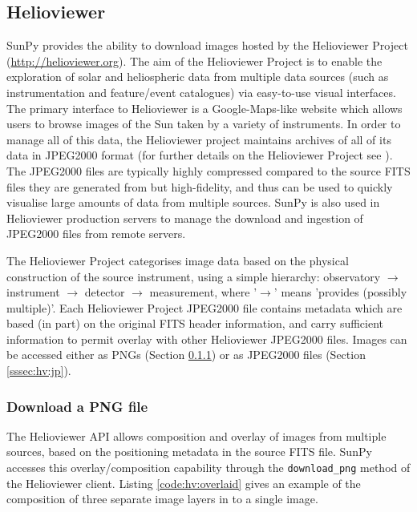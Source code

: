 \subsection{Helioviewer}\label{ssec:hv}

SunPy provides the ability to download images hosted by the
Helioviewer Project (\href{http://helioviewer.org}{http://helioviewer.org}).  
The aim of the Helioviewer Project is to enable
the exploration of solar and heliospheric data from multiple data
sources (such as instrumentation and feature/event catalogues) via
easy-to-use visual interfaces.  The primary interface to Helioviewer is a
Google-Maps-like website which allows users to browse images of the Sun
taken by a variety of instruments. In order to manage all of this data, the Helioviewer
project maintains archives of all of its data in JPEG2000 format (for further
details on the Helioviewer Project see \cite{muller2009}). The
JPEG2000 files are typically highly compressed compared to the source
FITS files they are generated from but high-fidelity, and thus can be used to quickly
visualise large amounts of data from multiple sources.  SunPy is
also used in Helioviewer production servers to manage the download and
ingestion of JPEG2000 files from remote servers.

The Helioviewer Project categorises image data based on the physical
construction of the source instrument, using a simple hierarchy:
observatory $\rightarrow$ instrument $\rightarrow$ detector
$\rightarrow$ measurement, where '$\rightarrow$' means 'provides
(possibly multiple)'.  
Each Helioviewer Project JPEG2000 file contains
metadata which are based (in part) on the original FITS header
information, and carry sufficient information to permit overlay with
other Helioviewer JPEG2000 files. Images can be accessed either as
PNGs (Section \ref{sssec:hv:png}) or as JPEG2000 files (Section
\ref{sssec:hv:jp}).

\subsubsection{Download a PNG file}\label{sssec:hv:png}

The Helioviewer API allows composition and overlay of images from
multiple sources, based on the positioning metadata in the source FITS
file.  SunPy accesses this overlay/composition capability through the
\texttt{download\_png} method of the Helioviewer client.  Listing
\ref{code:hv:overlaid} gives an example of the composition of three
separate image layers in to a single image.

